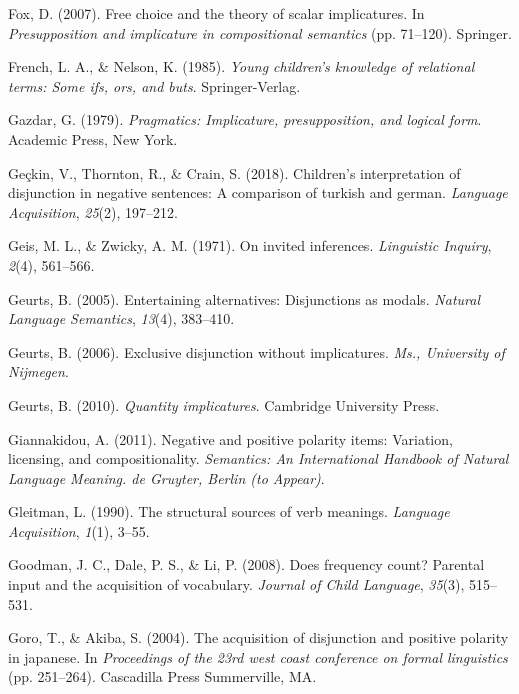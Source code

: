 \documentclass[oneside]{report}
\theoremstyle{definition}
\theoremstyle{definition}
\theoremstyle{definition}
\theoremstyle{remark}
\begin{document}
\hypertarget{ref-fox2007free}{}
Fox, D. (2007). Free choice and the theory of scalar implicatures. In
\emph{Presupposition and implicature in compositional semantics} (pp.
71--120). Springer.

\hypertarget{ref-frenchNelson1985}{}
French, L. A., \& Nelson, K. (1985). \emph{Young children's knowledge of
relational terms: Some ifs, ors, and buts}. Springer-Verlag.

\hypertarget{ref-gazdar79}{}
Gazdar, G. (1979). \emph{Pragmatics: Implicature, presupposition, and
logical form}. Academic Press, New York.

\hypertarget{ref-gecckin2018children}{}
Geçkin, V., Thornton, R., \& Crain, S. (2018). Children's interpretation
of disjunction in negative sentences: A comparison of turkish and
german. \emph{Language Acquisition}, \emph{25}(2), 197--212.

\hypertarget{ref-geis1971invited}{}
Geis, M. L., \& Zwicky, A. M. (1971). On invited inferences.
\emph{Linguistic Inquiry}, \emph{2}(4), 561--566.

\hypertarget{ref-geurts2005entertaining}{}
Geurts, B. (2005). Entertaining alternatives: Disjunctions as modals.
\emph{Natural Language Semantics}, \emph{13}(4), 383--410.

\hypertarget{ref-geurts2006exclusive}{}
Geurts, B. (2006). Exclusive disjunction without implicatures.
\emph{Ms., University of Nijmegen}.

\hypertarget{ref-geurts2010quantity}{}
Geurts, B. (2010). \emph{Quantity implicatures}. Cambridge University
Press.

\hypertarget{ref-giannakidou2011negative}{}
Giannakidou, A. (2011). Negative and positive polarity items: Variation,
licensing, and compositionality. \emph{Semantics: An International
Handbook of Natural Language Meaning. de Gruyter, Berlin (to Appear)}.

\hypertarget{ref-gleitman1990structural}{}
Gleitman, L. (1990). The structural sources of verb meanings.
\emph{Language Acquisition}, \emph{1}(1), 3--55.

\hypertarget{ref-goodman2008does}{}
Goodman, J. C., Dale, P. S., \& Li, P. (2008). Does frequency count?
Parental input and the acquisition of vocabulary. \emph{Journal of Child
Language}, \emph{35}(3), 515--531.

\hypertarget{ref-goro2004acquisition}{}
Goro, T., \& Akiba, S. (2004). The acquisition of disjunction and
positive polarity in japanese. In \emph{Proceedings of the 23rd west
coast conference on formal linguistics} (pp. 251--264). Cascadilla Press
Summerville, MA.
\end{document}
